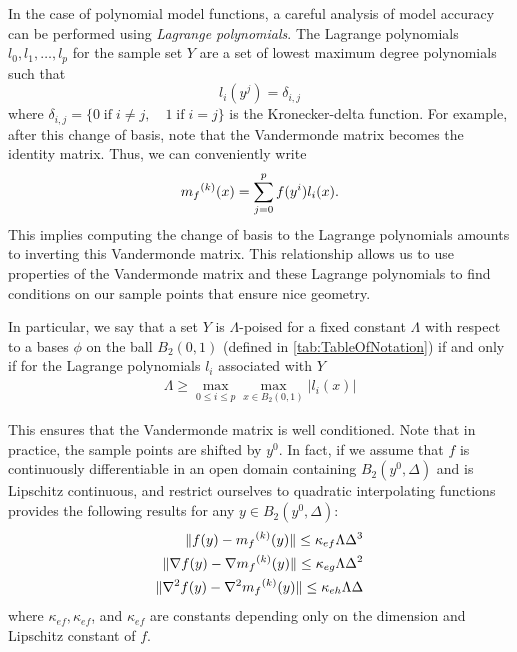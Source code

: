 In the case of polynomial model functions, a careful analysis of model accuracy can be performed using \emph{Lagrange polynomials}.
The Lagrange polynomials $l_0, l_1, \ldots, l_p$ for the sample set $Y$ are a set of lowest maximum degree polynomials such that
\[
l_i(y^j) = \delta_{i,j}
\]
where $\delta_{i,j} = \{0 \;\text{if}\; i\ne j,\quad 1 \;\text{if} \; i = j \}$ is the Kronecker-delta function.
For example, after this change of basis, note that the Vandermonde matrix becomes the identity matrix.
Thus, we can conveniently write
\[
\label{reg}
{{m}_f}^{(k)}(x) = \sum^p_{j=0}f(y^i)l_i(x).
\]
This implies computing the change of basis to the Lagrange polynomials amounts to inverting this Vandermonde matrix.
This relationship allows us to use properties of the Vandermonde matrix and these Lagrange polynomials to find conditions on our sample points that ensure nice geometry.

In particular, we say that a set $Y$ is $\Lambda$-poised for a fixed constant $\Lambda$ with respect to a bases $\phi$ on the ball 
$B_2(0, 1)$ (defined in \cref{tab:TableOfNotation}) if and only if for the Lagrange polynomials $l_i$ associated with $Y$
\begin{align}
\Lambda \ge \max_{0\le i\le p}\max_{x\in B_2(0, 1)}|l_i(x)|
\end{align}


This ensures that the Vandermonde matrix is well conditioned.
Note that in practice, the sample points are shifted by $y^0$.
In fact, if we assume that $f$ is continuously differentiable in an open domain containing $B_2(y^0, \Delta)$ and is Lipschitz continuous, and restrict ourselves to quadratic interpolating functions \cite{DUMMY:intro_book} provides the following results for any $y \in B_2(y^0, \Delta)$:
\begin{align}
 \|f(y) - {{m}_f}^{(k)}(y)\| \le \kappa_{ef} \Lambda \Delta^3 \\
 \|\nabla f(y) - \nabla {{m}_f}^{(k)}(y)\| \le \kappa_{eg} \Lambda \Delta^2 \\
 \|\nabla^2 f(y) - \nabla^2 {{m}_f}^{(k)}(y)\| \le \kappa_{eh}\Lambda \Delta \\
\end{align}
where
$\kappa_{ef}, \kappa_{ef}$, and $\kappa_{ef}$ are constants depending only on the dimension and Lipschitz constant of $f$.


